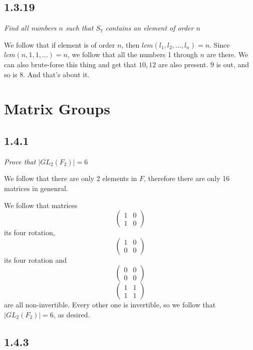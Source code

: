\documentclass[11pt,oneside,titlepage]{book}
\begin{document}
\subsection*{1.3.19}

\textit{Find all numbers $n$ such that $S_7$ contains an element of order $n$}

We follow that if element is of order $n$, then $lcm(l_1, l_2, ..., l_n) = n$.
Since $lcm(n, 1, 1, ...) = n$, we follow that all the numbers 1 through $n$ are there.
We can also brute-forse this thing and get that $10, 12$ are also present. $9$ is out,
and so is 8. And that's about it.

\section{Matrix Groups}

\subsection*{1.4.1}

\textit{Prove that $|GL_2(F_2)| = 6$}

We follow that there are only $2$ elements in $F$, therefore there are only 16 matrices
in genenral.

We follow that matrices
$$
\begin{pmatrix}
  1 & 0 \\
  1 & 0
\end{pmatrix}
$$
its four rotation,
$$
\begin{pmatrix}
  1 & 0 \\
  0 & 0
\end{pmatrix}
$$
its four rotation and
$$
\begin{pmatrix}
  0 & 0 \\
  0 & 0
\end{pmatrix}
$$
$$
\begin{pmatrix}
  1 & 1 \\
  1 & 1
\end{pmatrix}
$$
are all non-invertible. Every other one is invertible, so we follow that $|GL_2(F_2)| = 6$,
as desired.

\subsection*{1.4.3}
\end{document}

